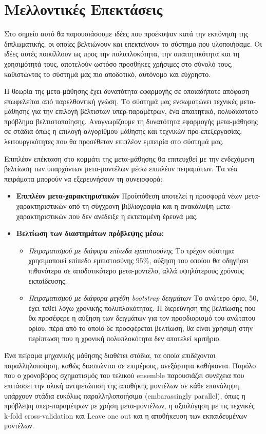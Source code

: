 \chapter{Μελλοντικές Επεκτάσεις}
Στο σημείο αυτό θα παρουσιάσουμε ιδέες που προέκυψαν κατά την εκπόνηση της διπλωματικής, οι οποίες βελτιώνουν και επεκτείνουν το σύστημα που υλοποιήσαμε. Οι ιδέες αυτές ποικίλλουν ως προς την πολυπλοκότητα, την απαιτητικότητα και τη χρησιμότητά τους, αποτελούν ωστόσο προσθήκες χρήσιμες στο σύνολό τους, καθιστώντας το σύστημά μας πιο αποδοτικό, αυτόνομο και εύχρηστο.

Η θεωρία της μετα-μάθησης έχει δυνατότητα εφαρμογής σε οποιαδήποτε απόφαση επωφελείται από παρελθοντική γνώση. Το σύστημά μας ενσωματώνει τεχνικές μετα-μάθησης για την επιλογή βέλτιστων υπερ-παραμέτρων, ένα απαιτητικό, πολυδιάστατο πρόβλημα βελτιστοποίησης. Αναγνωρίζουμε τη δυνατότητα εφαρμογής μετα-μάθησης σε στάδια όπως η επιλογή αλγορίθμου μάθησης και τεχνικών προ-επεξεργασίας, λειτουργικότητες που θα προσέθεταν επιπλέον εμπειρία στο σύστημά μας. 

Επιπλέον επέκταση στο κομμάτι της μετα-μάθησης θα επιτευχθεί με την ενδεχόμενη βελτίωση των υπαρχόντων μετα-μοντέλων μέσω επιπλέον πειραμάτων. Τα νέα πειράματα μπορούν να εξερευνήσουν τη συνεισφορά:
\begin{itemize}
	\item \textbf{Επιπλέον μετα-χαρακτηριστικών} Προϋπόθεση αποτελεί η προσφορά νέων μετα-χαρακτηρι\-στικών από τη σύγχρονη βιβλιογραφία και η ανακάλυψη μετα-χαρακτηριστικών που δεν ανέδειξε η εκτεταμένη έρευνά μας.
	\item \textbf{Βελτίωση των διαστημάτων πρόβλεψης μέσω:}
	\begin{itemize}
		\item \textit{Πειραματισμού με διάφορα επίπεδα εμπιστοσύνης} Το τρέχον σύστημα χρησιμοποιεί επίπεδο εμπιστοσύνης $95\%$, αύξηση του οποίου θα οδηγήσει πιθανότερα σε αποδοτικότερο μετα-μοντέλο, αλλά υψηλότερους χρόνους εκπαίδευσης.
		\item \textit{Πειραματισμού με διάφορα μεγέθη bootstrap δειγμάτων} Το ανώτερο όριο, 50, έχει τεθεί λόγω χρονικής πολυπλοκότητας. Η διερεύνηση της βελτίωσης που θα προσέφερε η αύξηση των δειγμάτων για τον προσδιορισμό του ανώτατου ορίου, πέρα από το οποίο δε προσφέρεται βελτίωση, θα είναι χρήσιμη στην περίπτωση που η χρονική πολυπλοκότητα δεν αποτελεί κριτήριο.
	\end{itemize} 
\end{itemize}

Ένα πείραμα μηχανικής μάθησης διαθέτει στάδια, τα οποία επιδέχονται παραλληλοποίηση, καθώς διασπώνται σε επιμέρους, ανεξάρτητα καθήκοντα. Παρόλο που ο χρονοβόρος σχηματισμός του τελικού ensemble παρουσιάζει συνέχεια που επιτάσσει την ολική αντιμετώπιση της αποθήκης μοντέλων σε κάθε επανάληψη, υπάρχουν στάδια ευκόλως παραλληλοποιήσιμα (embarassingly parallel), όπως η πρόβλεψη υπερ-παραμέτρων με χρήση μετα-μοντέλων, η αξιολόγηση με τις τεχνικές k-fold cross-validation και Leave one out και η αποθήκευση των εκπαιδευμένων μοντέλων.

